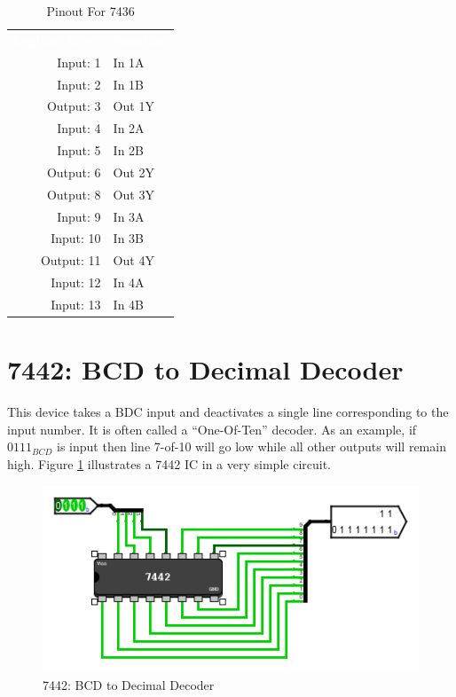 \begin{table}[H]
	\sffamily
	\newcommand{\head}[1]{\textcolor{white}{\textbf{#1}}}		
	\begin{center}
		\begin{tabular}{rl} 
			\rowcolor{black!75}
			\head{Logisim Label} & \head{Function} \\
			Input: 1   & In 1A  \\
			Input: 2   & In 1B  \\
			Output: 3  & Out 1Y \\
			Input: 4   & In 2A  \\
			Input: 5   & In 2B  \\
			Output: 6  & Out 2Y \\
			Output: 8  & Out 3Y \\
			Input: 9   & In 3A  \\
			Input: 10  & In 3B  \\
			Output: 11 & Out 4Y \\
			Input: 12  & In 4A  \\
			Input: 13  & In 4B  \\
		\end{tabular}
	\end{center}
	\caption{Pinout For 7436}
	\label{tab:50-7436}
\end{table}

\section{7442: BCD to Decimal Decoder}

This device takes a BDC input and deactivates a single line corresponding to the input number. It is often called a ``One-Of-Ten'' decoder. As an example, if $ 0111_{BCD} $ is input then line 7-of-10 will go low while all other outputs will remain high. Figure \ref{fig:50-7442} illustrates a 7442 \ac{IC} in a very simple circuit.

\begin{figure}[H]
	\centering
	\includegraphics[width=\maxwidth{.95\linewidth}]{gfx/50-7442}
	\caption{7442: BCD to Decimal Decoder}
	\label{fig:50-7442}
\end{figure}

